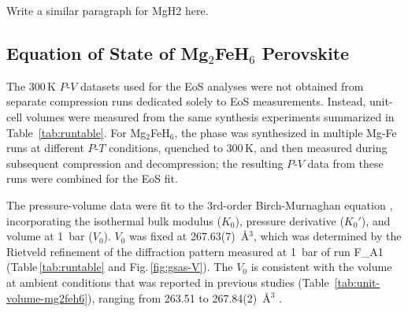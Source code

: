 \documentclass[draft,jgrga,12pt]{agujournal2019}
\begin{document}
\begin{cbox}
    Write a similar paragraph for MgH2 here.
\end{cbox}

\subsection{Equation of State of Mg$_2$FeH$_6$ Perovskite}


The 300\,K $P$-$V$ datasets used for the EoS analyses were not obtained from separate compression runs dedicated solely to EoS measurements. 
Instead, unit-cell volumes were measured from the same synthesis experiments summarized in Table~\ref{tab:runtable}. 
For Mg$_2$FeH$_6$, the phase was synthesized in multiple Mg-Fe runs at different $P$-$T$ conditions, quenched to 300\,K, and then measured during subsequent compression and decompression; the resulting $P$-$V$ data from these runs were combined for the EoS fit. 

The pressure-volume data were fit to {the} 3rd-order Birch-Murnaghan equation \cite{birch_elasticity_1952}, incorporating the isothermal bulk modulus ($K_0$), pressure derivative ($K_{0}'$), and volume at 1~bar ($V_0$). 
$V_0$ was fixed at 267.63(7)~\AA$^3$, which was determined by the Rietveld refinement of the diffraction pattern measured at 1~bar of run F\_A1 (Table\,\ref{tab:runtable} and Fig.\,\ref{fig:gsas-V}). 
The $V_0$ is consistent with the volume at ambient conditions that was reported in previous studies (Table~\ref{tab:unit-volume-mg2feh6}), ranging from 263.51 to 267.84(2)~\AA$^3$ \cite{george_bulk_2009, zhou_structural_2011, polanski_mg2feh6_2019, lang_insitu_2017, retuerto_neutron_2015, zareii_structural_2012, wang_preparation_2010, retuerto_highpressure_2010}. 
\end{document}
